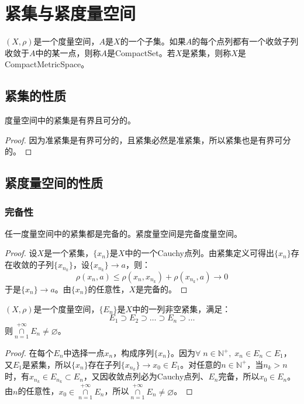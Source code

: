 \section{紧集与紧度量空间}
\begin{definition}
	$(X,\rho)$是一个度量空间，$A$是$X$的一个子集。如果$A$的每个点列都有一个收敛子列收敛于$A$中的某一点，则称$A$是\gls{CompactSet}。若$X$是紧集，则称$X$是\gls{CompactMetricSpace}。
\end{definition}

\subsection{紧集的性质}
\begin{theorem}
	度量空间中的紧集是有界且可分的。
\end{theorem}
\begin{proof}
	因为准紧集是有界可分的，且紧集必然是准紧集，所以紧集也是有界可分的。
\end{proof}

\subsection{紧度量空间的性质}
\subsubsection{完备性}
\begin{theorem}
	任一度量空间中的紧集都是完备的。紧度量空间是完备度量空间。
\end{theorem}
\begin{proof}
	设$X$是一个紧集，$\{x_n\}$是$X$中的一个Cauchy点列。由紧集定义可得出$\{x_n\}$存在收敛的子列$\{x_{n_k}\}$，设$\{x_{n_k}\}\to a$，则：
	\begin{equation*}
		\rho(x_n,a)\leqslant\rho(x_n,x_{n_k})+\rho(x_{n_k},a)\to0
	\end{equation*}
	于是$\{x_n\}\to a$。由$\{x_n\}$的任意性，$X$是完备的。
\end{proof}
\begin{theorem}
	$(X,\rho)$是一个度量空间，$\{E_n\}$是$X$中的一列非空紧集，满足：
	\begin{equation*}
		E_1\supset E_2\supset\dots\supset E_n\supset\dots
	\end{equation*}
	则$\underset{n=1}{\overset{+\infty}{\cap}}E_n\ne\varnothing$。
\end{theorem}
\begin{proof}
	在每个$E_n$中选择一点$x_n$，构成序列$\{x_n\}$。因为$\forall\;n\in\mathbb{N}^+,\;x_n\in E_n\subset E_1$，又$E_1$是紧集，所以$\{x_n\}$存在子列$\{x_{n_k}\}\rightarrow x_0\in E_1$。对任意的$n\in\mathbb{N}^+$，当$n_k>n$时，有$x_{n_k}\in E_{n_k}\subset E_n$，又因收敛点列必为Cauchy点列、$E_n$完备，所以$x_0\in E_n$。由$n$的任意性，$x_0\in\underset{n=1}{\overset{+\infty}{\cap}}E_n$，所以$\underset{n=1}{\overset{+\infty}{\cap}}E_n\ne\varnothing$。
\end{proof}

